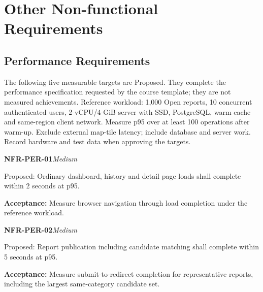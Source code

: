 \documentclass[12pt,a4paper,oneside]{report}
\begin{document}
\chapter{Other Non-functional Requirements}


\section{Performance Requirements}

The following five measurable targets are Proposed. They complete the performance specification requested by the course template; they are not measured achievements. Reference workload: 1,000 Open reports, 10 concurrent authenticated users, 2-vCPU/4-GiB server with SSD, PostgreSQL, warm cache and same-region client network. Measure p95 over at least 100 operations after warm-up. Exclude external map-tile latency; include database and server work. Record hardware and test data when approving the targets.

\noindent\begin{minipage}{\linewidth}\textbf{NFR-PER-01}\hfill\textit{Medium}\par\nopagebreak

Proposed: Ordinary dashboard, history and detail page loads shall complete within 2 seconds at p95.

{\color{muted}\textbf{Acceptance:} Measure browser navigation through load completion under the reference workload.\par}\end{minipage}\par\vspace{5pt}

\noindent\begin{minipage}{\linewidth}\textbf{NFR-PER-02}\hfill\textit{Medium}\par\nopagebreak

Proposed: Report publication including candidate matching shall complete within 5 seconds at p95.

{\color{muted}\textbf{Acceptance:} Measure submit-to-redirect completion for representative reports, including the largest same-category candidate set.\par}\end{minipage}\par\vspace{5pt}
\end{document}
